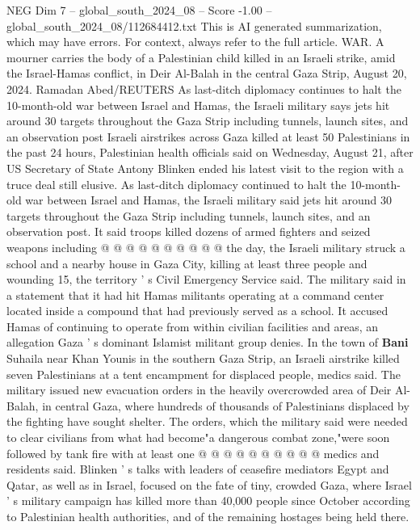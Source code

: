 \begin{textsample}{NEG Dim 7 – global\_south\_2024\_08 – Score -1.00 – global\_south\_2024\_08/112684412.txt}  \label{ex:f7_neg_273}
This is AI generated summarization, which may have errors.
For context, always refer to the full article.
WAR.
A mourner carries the body of a Palestinian child killed in an Israeli strike, amid the Israel-Hamas conflict, in Deir Al-Balah in the central Gaza Strip, August 20, 2024.
Ramadan Abed/REUTERS As last-ditch diplomacy continues to halt the 10-month-old war between Israel and Hamas, the Israeli military says jets hit around 30 targets throughout the Gaza Strip including tunnels, launch sites, and an observation post Israeli airstrikes across Gaza killed at least 50 Palestinians in the past 24 hours, Palestinian health officials said on Wednesday, August 21, after US Secretary of State Antony Blinken ended his latest visit to the region with a truce deal still elusive.
As last-ditch diplomacy continued to halt the 10-month-old war between Israel and Hamas, the Israeli military said jets hit around 30 targets throughout the Gaza Strip including tunnels, launch sites, and an observation post.
It said troops killed dozens of armed fighters and seized weapons including @ @ @ @ @ @ @ @ @ @ the day, the Israeli military struck a school and a nearby house in Gaza City, killing at least three people and wounding 15, the territory ' s Civil Emergency Service said.
The military said in a statement that it had hit Hamas militants operating at a command center located inside a compound that had previously served as a school.
It accused Hamas of continuing to operate from within civilian facilities and areas, an allegation Gaza ' s dominant Islamist militant group denies.
In the town of \textbf{Bani} Suhaila near Khan Younis in the southern Gaza Strip, an Israeli airstrike killed seven Palestinians at a tent encampment for displaced people, medics said.
The military issued new evacuation orders in the heavily overcrowded area of Deir Al-Balah, in central Gaza, where hundreds of thousands of Palestinians displaced by the fighting have sought shelter.
The orders, which the military said were needed to clear civilians from what had become"a dangerous combat zone,"were soon followed by tank fire with at least one @ @ @ @ @ @ @ @ @ @ medics and residents said.
Blinken ' s talks with leaders of ceasefire mediators Egypt and Qatar, as well as in Israel, focused on the fate of tiny, crowded Gaza, where Israel ' s military campaign has killed more than 40,000 people since October according to Palestinian health authorities, and of the remaining hostages being held there.

\end{textsample}
